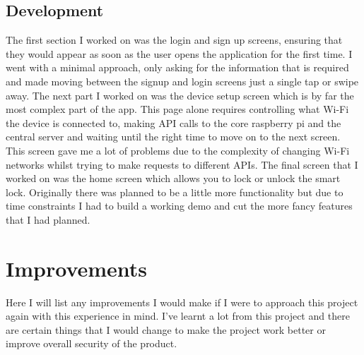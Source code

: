 \subsection{Development}
The first section I worked on was the login and sign up screens, ensuring that they would appear as soon as the user opens the application for the first time. I went with a minimal approach, only asking for the information that is required and made moving between the signup and login screens just a single tap or swipe away. The next part I worked on was the device setup screen which is by far the most complex part of the app. This page alone requires controlling what Wi-Fi the device is connected to, making API calls to the core raspberry pi and the central server and waiting until the right time to move on to the next screen. This screen gave me a lot of problems due to the complexity of changing Wi-Fi networks whilst trying to make requests to different APIs. The final screen that I worked on was the home screen which allows you to lock or unlock the smart lock. Originally there was planned to be a little more functionality but due to time constraints I had to build a working demo and cut the more fancy features that I had planned.

\section{Improvements}
Here I will list any improvements I would make if I were to approach this project again with this experience in mind. I've learnt a lot from this project and there are certain things that I would change to make the project work better or improve overall security of the product.

